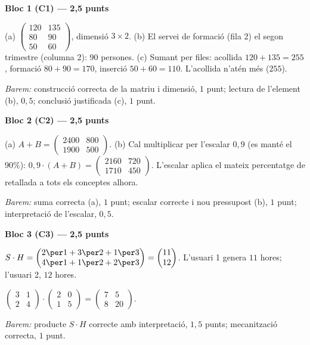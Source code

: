 \begin{solucions}
\textbf{Bloc 1 (C1) — 2,5 punts}
\begin{sollist}
  \item (a) $\begin{pmatrix} 120 & 135 \\ 80 & 90 \\ 50 & 60 \end{pmatrix}$,
        \;dimensió $3\times 2$. \;(b) El servei de formació (fila 2) el segon
        trimestre (columna 2): $90$ persones. \;(c) Sumant per files: acollida
        $120+135=255$, formació $80+90=170$, inserció $50+60=110$. L'acollida n'atén
        més ($255$).
\end{sollist}
\textit{Barem:} construcció correcta de la matriu i dimensió, $1$ punt; lectura de
l'element (b), $0{,}5$; conclusió justificada (c), $1$ punt.

\textbf{Bloc 2 (C2) — 2,5 punts}
\begin{sollist}
  \item (a) $A+B=\begin{pmatrix} 2400 & 800 \\ 1900 & 500 \end{pmatrix}$. \;(b) Cal
        multiplicar per l'escalar $0{,}9$ (es manté el $90\%$):
        $0{,}9\cdot(A+B)=\begin{pmatrix} 2160 & 720 \\ 1710 & 450 \end{pmatrix}$.
        L'escalar aplica el mateix percentatge de retallada a tots els conceptes
        alhora.
\end{sollist}
\textit{Barem:} suma correcta (a), $1$ punt; escalar correcte i nou pressupost (b),
$1$ punt; interpretació de l'escalar, $0{,}5$.

\textbf{Bloc 3 (C3) — 2,5 punts}
\begin{sollist}
  \item $S\cdot H=\begin{pmatrix} 2\per 1+3\per 2+1\per 3 \\ 4\per 1+1\per 2+2\per 3 \end{pmatrix}
        =\begin{pmatrix} 11 \\ 12 \end{pmatrix}$. L'usuari 1 genera $11$ hores;
        l'usuari 2, $12$ hores.
  \item $\begin{pmatrix} 3 & 1 \\ 2 & 4 \end{pmatrix}\cdot\begin{pmatrix} 2 & 0 \\ 1 & 5 \end{pmatrix}
        =\begin{pmatrix} 7 & 5 \\ 8 & 20 \end{pmatrix}$.
\end{sollist}
\textit{Barem:} producte $S\cdot H$ correcte amb interpretació, $1{,}5$ punts;
mecanització correcta, $1$ punt.


\end{solucions}
